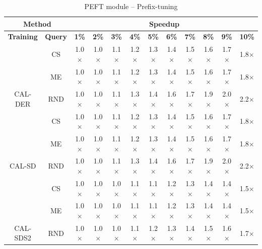 \begin{table}[htbp]
\begin{subtable}{\linewidth}
\begin{tabular}{c|c|cccccccccc}
\toprule
\multicolumn{2}{c|}{\textbf{Method}} & \multicolumn{10}{c}{\textbf{Speedup}} \\
\midrule
\textbf{Training} & \textbf{Query} & \textbf{1\%} & \textbf{2\%} & \textbf{3\%} & \textbf{4\%} & \textbf{5\%} & \textbf{6\%} & \textbf{7\%} & \textbf{8\%} & \textbf{9\%} & \textbf{10\%}\\
\midrule
 & CS & 1.0$\times$ & 1.0$\times$ & 1.1$\times$ & 1.2$\times$ & 1.3$\times$ & 1.4$\times$ & 1.5$\times$ & 1.6$\times$ & 1.7$\times$ & 1.8$\times$\\

 & ME & 1.0$\times$ & 1.0$\times$ & 1.1$\times$ & 1.2$\times$ & 1.3$\times$ & 1.4$\times$ & 1.5$\times$ & 1.6$\times$ & 1.7$\times$ & 1.8$\times$\\

\multirow{-3}{*}{\raggedright\arraybackslash CAL-DER} & RND & 1.0$\times$ & 1.0$\times$ & 1.1$\times$ & 1.3$\times$ & 1.4$\times$ & 1.6$\times$ & 1.7$\times$ & 1.9$\times$ & 2.0$\times$ & 2.2$\times$\\
\midrule
 & CS & 1.0$\times$ & 1.0$\times$ & 1.1$\times$ & 1.2$\times$ & 1.3$\times$ & 1.4$\times$ & 1.5$\times$ & 1.6$\times$ & 1.7$\times$ & 1.8$\times$\\

 & ME & 1.0$\times$ & 1.0$\times$ & 1.1$\times$ & 1.2$\times$ & 1.3$\times$ & 1.4$\times$ & 1.5$\times$ & 1.6$\times$ & 1.7$\times$ & 1.8$\times$\\

\multirow{-3}{*}{\raggedright\arraybackslash CAL-SD} & RND & 1.0$\times$ & 1.0$\times$ & 1.1$\times$ & 1.3$\times$ & 1.4$\times$ & 1.6$\times$ & 1.7$\times$ & 1.9$\times$ & 2.0$\times$ & 2.2$\times$\\
\midrule
 & CS & 1.0$\times$ & 1.0$\times$ & 1.0$\times$ & 1.1$\times$ & 1.1$\times$ & 1.2$\times$ & 1.3$\times$ & 1.4$\times$ & 1.4$\times$ & 1.5$\times$\\

 & ME & 1.0$\times$ & 1.0$\times$ & 1.0$\times$ & 1.1$\times$ & 1.1$\times$ & 1.2$\times$ & 1.3$\times$ & 1.4$\times$ & 1.4$\times$ & 1.5$\times$\\

\multirow{-3}{*}{\raggedright\arraybackslash CAL-SDS2} & RND & 1.0$\times$ & 1.0$\times$ & 1.0$\times$ & 1.1$\times$ & 1.2$\times$ & 1.3$\times$ & 1.4$\times$ & 1.5$\times$ & 1.6$\times$ & 1.7$\times$\\
\bottomrule
\end{tabular}
\end{subtable}
\vspace{1em}
\begin{subtable}{\linewidth}
\centering
\caption{PEFT module -- Prefix-tuning}


\end{subtable}
\end{table}
